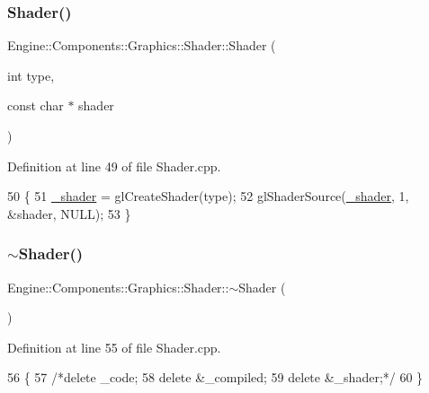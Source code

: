 \subsubsection{\texorpdfstring{Shader()}{Shader()}\hspace{0.1cm}{\footnotesize\ttfamily [2/2]}}
{\footnotesize\ttfamily Engine\+::\+Components\+::\+Graphics\+::\+Shader\+::\+Shader (\begin{DoxyParamCaption}\item[{int}]{type,  }\item[{const char $\ast$}]{shader }\end{DoxyParamCaption})}



Definition at line 49 of file Shader.\+cpp.


\begin{DoxyCode}
50 \{
51     \mbox{\hyperlink{classEngine_1_1Components_1_1Graphics_1_1Shader_a4494d72a65715eb9f02e06a533684872}{\_shader}} = glCreateShader(type);
52     glShaderSource(\mbox{\hyperlink{classEngine_1_1Components_1_1Graphics_1_1Shader_a4494d72a65715eb9f02e06a533684872}{\_shader}}, 1, &shader, NULL);
53 \}
\end{DoxyCode}
\mbox{\label{classEngine_1_1Components_1_1Graphics_1_1Shader_a9a82a7a62443e928d9d95e3a0e4f1407}} 
\subsubsection{\texorpdfstring{$\sim$\+Shader()}{~Shader()}}
{\footnotesize\ttfamily Engine\+::\+Components\+::\+Graphics\+::\+Shader\+::$\sim$\+Shader (\begin{DoxyParamCaption}{ }\end{DoxyParamCaption})}



Definition at line 55 of file Shader.\+cpp.


\begin{DoxyCode}
56 \{
57     \textcolor{comment}{/*delete \_code;}
58 \textcolor{comment}{    delete &\_compiled;}
59 \textcolor{comment}{    delete &\_shader;*/}
60 \}
\end{DoxyCode}


